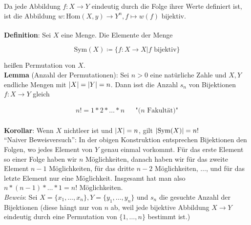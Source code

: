 \documentclass{article}
\begin{document}
Da jede Abbildung $f \colon X \to Y$ eindeutig durch die Folge ihrer Werte definiert ist, ist die Abbildung
$w \colon \text{Hom}(X,y) \to Y^n, f \mapsto w(f)$ bijektiv. \\

\vspace{1mm} \\

\textbf{Definition}: Sei $X$ eine Menge. Die Elemente der Menge

\[
  \text{Sym}(X) \coloneqq \{ f \colon X \to X | f \text{ bijektiv} \}
\]

heißen Permutation von $X$. \\

\textbf{Lemma} (Anzahl der Permutationen): Sei $n > 0$ eine natürliche Zahle und $X, Y$
endliche Mengen mit $\abs{X} = \abs{Y} = n$. Dann isst die Anzahl $s_n$ von Bijektionen $f \colon X \to Y$
gleich

\begin{align*}
  n! = 1 * 2 * \ldots * n && \text{"($n$ Fakultät)"} \\ 
\end{align*}

\textbf{Korollar}: Wenn $X$ nichtleer ist und $\abs{X} = n$, gilt $\abs{\text{Sym}(X)} = n!$ \\

``Naiver Beweisversuch'': In der obigen Konstruktion entsprechen Bijektionen den Folgen, wo jedes Element
von $Y$ genau einmal vorkommt. Für das erste Element so einer Folge haben wir $n$ Möglichkeiten,
danach haben wir für das zweite Element $n - 1$ Möglichkeiten, für das dritte $n - 2$ Möglichkeiten,
$\ldots$, und für das letzte Element nur eine Möglichkeit.
Insgesamt hat man also $n * (n - 1) * \ldots * 1 = n!$ Möglichkeiten. \\

\emph{Beweis}: Sei $X = \{ x_1, \ldots, x_n\}, Y = \{ y_1, \ldots, y_n \}$ und $s_n$ die gesuchte Anzahl
der Bijektionen (diese hängt nur von $n$ ab, weil jede bijektive Abbildung $X \to Y$ eindeutig durch eine
Permutation von $\{ 1, \ldots, n \}$ bestimmt ist.)
\end{document}
